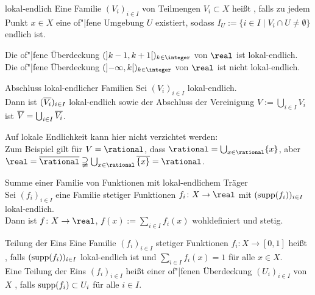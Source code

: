 \linie
\pagebreak

\begin{Def}{lokal-endlich}
    Eine Familie $(V_i)_{i \in I}$ von Teilmengen $V_i \subset X$ heißt
    , falls zu jedem Punkt $x \in X$ eine of"|fene
    Umgebung $U$ existiert, sodass
    $I_U := \{i \in I \;|\; V_i \cap U \not= \emptyset\}$ endlich ist.
\end{Def}

\begin{Bsp}
    Die of"|fene Überdeckung $(\left]k - 1, k + 1\right[)_{k \in \integer}$
    von $\real$ ist lokal-endlich. \\
    Die of"|fene Überdeckung $(\left]-\infty, k\right[)_{k \in \integer}$
    von $\real$ ist nicht lokal-endlich.
\end{Bsp}

\begin{Lemma}{Abschluss lokal-endlicher Familien}
    Sei $(V_i)_{i \in I}$ lokal-endlich. \\
    Dann ist $(\overline{V_i})_{i \in I}$ lokal-endlich sowie
    der Abschluss der Vereinigung $V := \bigcup_{i \in I} V_i$ ist
    $\overline{V} = \bigcup_{i \in I} \overline{V_i}$.
\end{Lemma}

\begin{Bem}
    Auf lokale Endlichkeit kann hier nicht verzichtet werden: \\
    Zum Beispiel gilt für $V = \rational$, dass
    $\rational = \bigcup_{x \in \rational} \{x\}$, aber
    $\real = \abschluss{\rational} \supsetneqq \bigcup_{x \in \rational}
    \abschluss{\{x\}} = \rational$.
\end{Bem}

\begin{Lemma}{Summe einer Familie von Funktionen mit lokal-endlichem Träger}\\
    Sei $(f_i)_{i \in I}$ eine Familie stetiger Funktionen
    $f_i\colon X \rightarrow \real$ mit $(\operatorname{supp}(f_i))_{i \in I}$
    lokal-endlich. \\
    Dann ist $f\colon X \rightarrow \real$, $f(x) := \sum_{i \in I} f_i(x)$
    wohldefiniert und stetig.
\end{Lemma}

\begin{Def}{Teilung der Eins}
    Eine Familie $(f_i)_{i \in I}$ stetiger Funktionen
    $f_i\colon X \rightarrow [0, 1]$ heißt
    ,
    falls $(\operatorname{supp}(f_i))_{i \in I}$ lokal-endlich ist und
    $\sum_{i \in I} f_i(x) = 1$ für alle $x \in X$. \\
    Eine Teilung der Eins $(f_i)_{i \in I}$ heißt einer of"|fenen Überdeckung
    $(U_i)_{i \in I}$ von $X$ , falls
    $\operatorname{supp}(f_i) \subset U_i$ für alle $i \in I$.
\end{Def}

